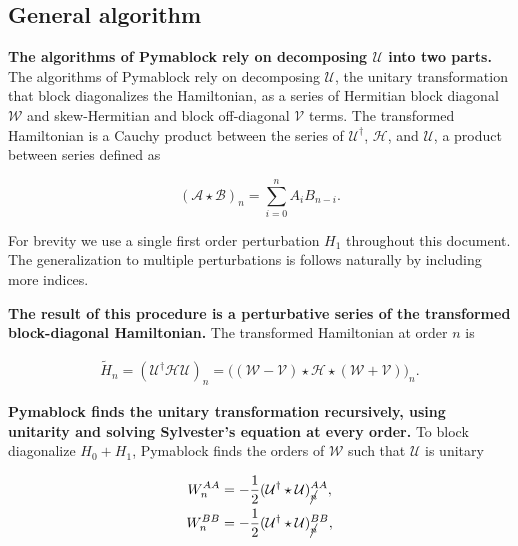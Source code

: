 \documentclass[submission, Codebases]{SciPost}
\begin{document}
{{\subsection{General algorithm}

\textbf{The algorithms of Pymablock rely on decomposing $\mathcal{U}$ into two parts.}
The algorithms of Pymablock rely on decomposing $\mathcal{U}$, the unitary transformation
that block diagonalizes the Hamiltonian, as a series of Hermitian
block diagonal $\mathcal{W}$ and skew-Hermitian and block off-diagonal $\mathcal{V}$ terms.
The transformed Hamiltonian is a Cauchy product between the series of
$\mathcal{U}^{\dagger}$, $\mathcal{H}$, and $\mathcal{U}$, a product between
series defined as

\begin{equation}
\label{cauchy_product}
(\mathcal{A} \star \mathcal{B})_{n} = \sum_{i=0}^{n} A_{i} B_{n-i}.
\end{equation}

For brevity we use a single first order perturbation $H_1$ throughout this
document. The generalization to multiple perturbations is follows naturally
by including more indices.

\textbf{The result of this procedure is a perturbative series of the transformed
block-diagonal Hamiltonian.}
The transformed Hamiltonian at order $n$ is

\begin{equation}
\label{h_tilde}
\begin{align} \tilde{H}_{n} = (\mathcal{U}^{\dagger} \mathcal{H}
\mathcal{U})_{n} = \Big ( (\mathcal{W}-\mathcal{V}) \star \mathcal{H} \star
(\mathcal{W}+\mathcal{V}) \Big)_{n}.
\end{align}
\end{equation}

\textbf{Pymablock finds the unitary transformation recursively, using unitarity and
solving Sylvester's equation at every order.}
To block diagonalize $H_0 + H_1$, Pymablock finds the
orders of $\mathcal{W}$ such that $\mathcal{U}$ is unitary

\begin{equation}
\label{unitarity}
\begin{align}
W_{n}^{AA} &= - \frac{1}{2} (\mathcal{U}^{\dagger} \star \mathcal{U})_{\cancel{n}}^{AA}, \\
W_{n}^{BB} &= - \frac{1}{2} (\mathcal{U}^{\dagger} \star \mathcal{U})_{\cancel{n}}^{BB},
\end{align}
\end{equation}

}}
\end{document}
